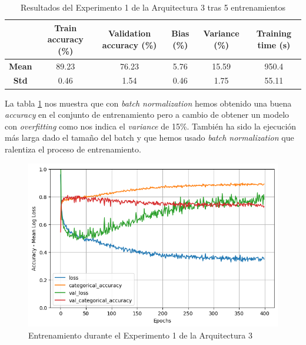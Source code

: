 \documentclass{article}
\begin{document}
			\begin{table}[!h]
				\begin{center}
					\begin{tabular}{ c | c | c | c | c | c |}
						\ & \textbf{Train accuracy (\%)} & \textbf{Validation accuracy (\%)} & \textbf{Bias (\%)} & \textbf{Variance (\%)} & \textbf{Training time (s)} \\ \hline
						\textbf{Mean} & 89.23 & 76.23 & 5.76 & 15.59 & 950.4 \\ \hline
						\textbf{Std} & 0.46 & 1.54 & 0.46 & 1.75 & 55.11 \\ \hline
					\end{tabular}
					\caption{Resultados del Experimento 1 de la Arquitectura 3 tras 5 entrenamientos}
					\label{tab:res-d-a3-e1}
				\end{center}
			\end{table}
			La tabla \ref{tab:res-d-a3-e1} nos muestra que con \textit{batch normalization} hemos obtenido una buena \textit{accuracy} en el conjunto de entrenamiento pero a cambio de obtener un modelo con \textit{overfitting} como nos indica el \textit{variance} de 15\%. Tambi\'en ha sido la ejecuci\'on m\'as larga dado el tama\~no del batch y que hemos usado \textit{batch normalization} que ralentiza el proceso de entrenamiento.
			\newpage
			 
			\begin{figure}[!h]
				\begin{center}
					\includegraphics[scale=0.5]{d-tr-a3-e1.png}		
					\caption{Entrenamiento durante el Experimento 1 de la Arquitectura 3}	
					\label{d-tr-a3-e1}
				\end{center}
			\end{figure}
			
\end{document}
